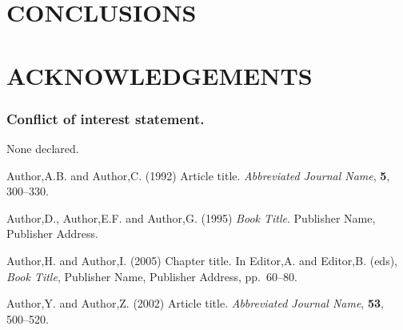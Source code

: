 \documentclass[a4,center,fleqn]{NAR}
\begin{document}
\section{CONCLUSIONS}

\section{ACKNOWLEDGEMENTS}


\subsubsection{Conflict of interest statement.} None declared.
\newpage


\begin{thebibliography}{4}

Author,A.B. and Author,C. (1992)
Article title.
\textit{Abbreviated Journal Name}, \textbf{5}, 300--330.

Author,D., Author,E.F. and Author,G. (1995)
\textit{Book Title}.
Publisher Name, Publisher Address.

Author,H. and Author,I. (2005)
Chapter title.
In
Editor,A. and Editor,B. (eds),
\textit{Book Title},
Publisher Name, Publisher Address,
pp.\ 60--80.

Author,Y. and Author,Z. (2002)
Article title.
\textit{Abbreviated Journal Name}, \textbf{53}, 500--520.

\end{thebibliography}
\end{document}

